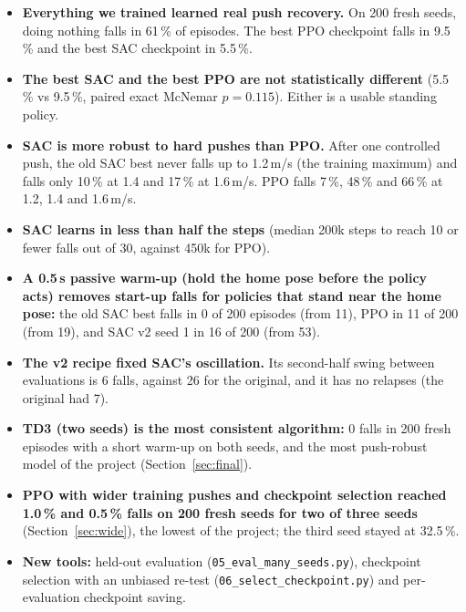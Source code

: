 \documentclass[11pt,a4paper]{article}
\begin{document}
\begin{good}[title={The good results}]
\begin{itemize}
\item \textbf{Everything we trained learned real push recovery.} On 200 fresh seeds, doing nothing falls in 61\,\% of episodes. The best PPO checkpoint falls in 9.5\,\% and the best SAC checkpoint in 5.5\,\%.
\item \textbf{The best SAC and the best PPO are not statistically different} (5.5\,\% vs 9.5\,\%, paired exact McNemar $p=0.115$). Either is a usable standing policy.
\item \textbf{SAC is more robust to hard pushes than PPO.} After one controlled push, the old SAC best never falls up to 1.2\,m/s (the training maximum) and falls only 10\,\% at 1.4 and 17\,\% at 1.6\,m/s. PPO falls 7\,\%, 48\,\% and 66\,\% at 1.2, 1.4 and 1.6\,m/s.
\item \textbf{SAC learns in less than half the steps} (median 200k steps to reach 10 or fewer falls out of 30, against 450k for PPO).
\item \textbf{A 0.5\,s passive warm-up (hold the home pose before the policy acts) removes start-up falls for policies that stand near the home pose:} the old SAC best falls in 0 of 200 episodes (from 11), PPO in 11 of 200 (from 19), and SAC v2 seed 1 in 16 of 200 (from 53).
\item \textbf{The v2 recipe fixed SAC's oscillation.} Its second-half swing between evaluations is 6 falls, against 26 for the original, and it has no relapses (the original had 7).
\item \textbf{TD3 (two seeds) is the most consistent algorithm:} 0 falls in 200 fresh episodes with a short warm-up on both seeds, and the most push-robust model of the project (Section~\ref{sec:final}).
\item \textbf{PPO with wider training pushes and checkpoint selection reached 1.0\,\% and 0.5\,\% falls on 200 fresh seeds for two of three seeds} (Section~\ref{sec:wide}), the lowest of the project; the third seed stayed at 32.5\,\%.
\item \textbf{New tools:} held-out evaluation (\texttt{05\_eval\_many\_seeds.py}), checkpoint selection with an unbiased re-test (\texttt{06\_select\_checkpoint.py}) and per-evaluation checkpoint saving.
\end{itemize}
\end{good}
\end{document}
